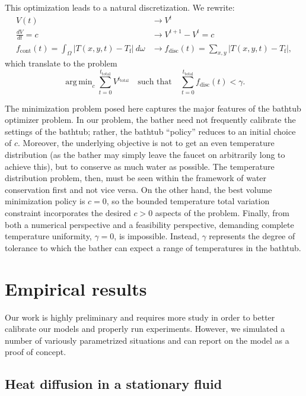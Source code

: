 \documentclass[12pt]{amsart}
\newcommand{\abs}[1]{\left|#1\right|}
\DeclareMathOperator*{\argmin}{\mathrm{arg\,min}}
\begin{document}
This optimization leads to a natural discretization. We rewrite:
\begin{align}
    V(t) &\longrightarrow V^t \\
    \frac{dV}{dt} = c &\longrightarrow V^{t+1} - V^t = c \\
    f_{\mathrm{cont}}(t) = \int_{\Omega} \abs{T(x,y,t) - T_{\mathrm{f}}} \
    d\omega &\longrightarrow f_{\mathrm{disc}}(t) = \sum_{x,y}\abs{T(x,y,t) -
        T_{\mathrm{f}}},
\end{align}
which translate to the problem
\begin{equation}
    \argmin_{c} \sum_{t=0}^{t_{\mathrm{total}}}V^{t_{\mathrm{total}}} \quad \text{such that} \quad
    \sum_{t=0}^{t_{\mathrm{total}}} f_{\mathrm{disc}}(t) < \gamma.
    \label{eq:\theequation}
\end{equation}

The minimization problem posed here captures the major features of the bathtub
optimizer problem. In our problem, the bather need not frequently calibrate the
settings of the bathtub; rather, the bathtub ``policy'' reduces to an initial
choice of $c$. Moreover, the underlying objective is not to get an even temperature
distribution (as the bather may simply leave the faucet on arbitrarily long to
achieve this), but to conserve as much water as possible. The temperature
distribution problem, then, must be seen within the framework of water
conservation first and not vice versa. On the other hand, the best volume
minimization policy is $c=0$, so the bounded temperature total variation
constraint incorporates the desired $c > 0$ aspects of the problem. Finally,
from both a numerical perspective and a feasibility perspective, demanding
complete temperature uniformity, $\gamma = 0$, is impossible. Instead, $\gamma$
represents the degree of tolerance to which the bather can expect a range of
temperatures in the bathtub.

\section{Empirical results}

Our work is highly preliminary and requires more study in order to better
calibrate our models and properly run experiments. However, we simulated a
number of variously parametrized situations and can report on the model as a
proof of concept.

\subsection{Heat diffusion in a stationary fluid}
\end{document}

